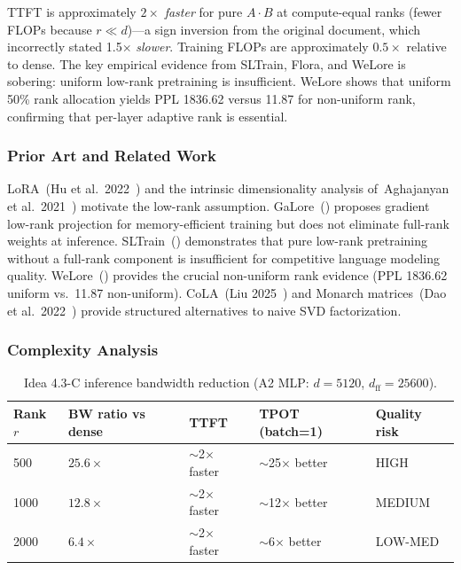 \documentclass[11pt]{article}
\begin{document}
TTFT is approximately $2\times$ \emph{faster} for pure $A \cdot B$ at compute-equal ranks (fewer FLOPs because $r \ll d$)---a sign inversion from the original document, which incorrectly stated 1.5$\times$ \emph{slower}. Training FLOPs are approximately $0.5\times$ relative to dense. The key empirical evidence from SLTrain, Flora, and WeLore is sobering: uniform low-rank pretraining is insufficient. WeLore shows that uniform 50\% rank allocation yields PPL 1836.62 versus 11.87 for non-uniform rank, confirming that per-layer adaptive rank is essential.

\subsubsection*{Prior Art and Related Work}

LoRA~(Hu et al.\ 2022~\cite{HuLoRA2022}) and the intrinsic dimensionality analysis of~Aghajanyan et al.\ 2021~\cite{Aghajanyan2021}) motivate the low-rank assumption. GaLore~(\cite{Zhao2024GaLore}) proposes gradient low-rank projection for memory-efficient training but does not eliminate full-rank weights at inference. SLTrain~(\cite{SLTrain2024}) demonstrates that pure low-rank pretraining without a full-rank component is insufficient for competitive language modeling quality. WeLore~(\cite{WeLore2024}) provides the crucial non-uniform rank evidence (PPL 1836.62 uniform vs.\ 11.87 non-uniform). CoLA~(Liu 2025~\cite{Liu2025CoLA}) and Monarch matrices~(Dao et al.\ 2022~\cite{DaoMonarch2022}) provide structured alternatives to naive SVD factorization.

\subsubsection*{Complexity Analysis}

\begin{table}[h]
\centering
\caption{Idea 4.3-C inference bandwidth reduction (A2 MLP: $d{=}5120$, $d_{\text{ff}}{=}25600$).}
\small
\begin{tabular}{lllll}
\toprule
Rank $r$ & BW ratio vs dense & TTFT & TPOT (batch=1) & Quality risk \\
\midrule
500  & $25.6\times$ & $\sim$2$\times$ faster & $\sim$25$\times$ better & HIGH \\
1000 & $12.8\times$ & $\sim$2$\times$ faster & $\sim$12$\times$ better & MEDIUM \\
2000 & $6.4\times$  & $\sim$2$\times$ faster & $\sim$6$\times$ better  & LOW-MED \\
\bottomrule
\end{tabular}
\end{table}
\end{document}
